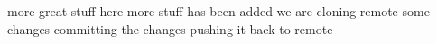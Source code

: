 more great stuff here
more stuff has been added
we are cloning
remote some changes
committing the changes
pushing it back to
remote 
